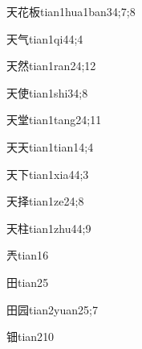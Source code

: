 \begin{verbete}{天花板}{tian1hua1ban3}{4;7;8}
\end{verbete}

\begin{verbete}{天气}{tian1qi4}{4;4}
\end{verbete}

\begin{verbete}{天然}{tian1ran2}{4;12}
\end{verbete}

\begin{verbete}{天使}{tian1shi3}{4;8}
\end{verbete}

\begin{verbete}{天堂}{tian1tang2}{4;11}
\end{verbete}

\begin{verbete}{天天}{tian1tian1}{4;4}
\end{verbete}

\begin{verbete}{天下}{tian1xia4}{4;3}
\end{verbete}

\begin{verbete}{天择}{tian1ze2}{4;8}
\end{verbete}

\begin{verbete}{天柱}{tian1zhu4}{4;9}
\end{verbete}

\begin{verbete}{兲}{tian1}{6}
\end{verbete}

\begin{verbete}{田}{tian2}{5}
\end{verbete}

\begin{verbete}{田园}{tian2yuan2}{5;7}
\end{verbete}

\begin{verbete}{钿}{tian2}{10}
\end{verbete}


